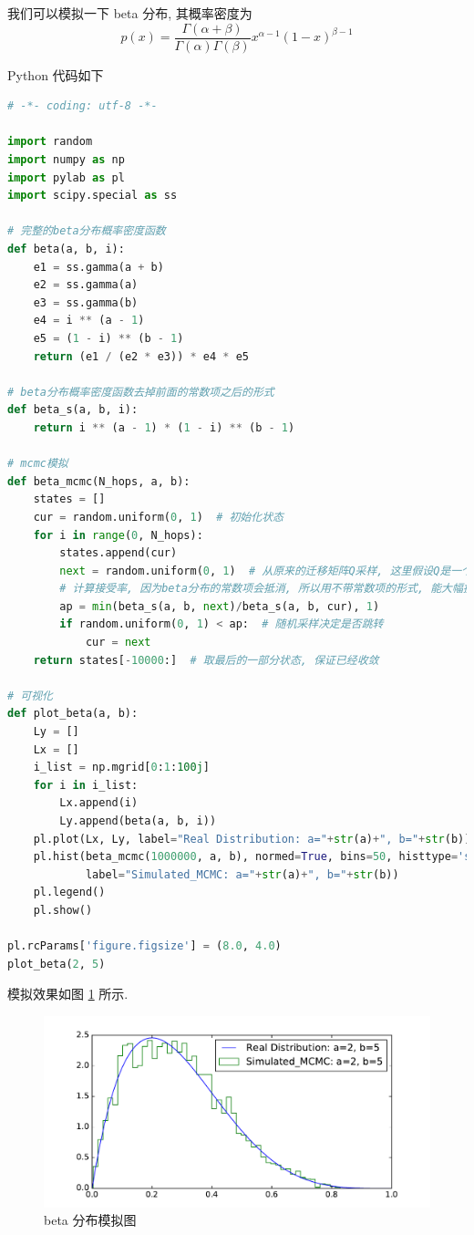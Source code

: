 \documentclass[a4paper,UTF8]{ctexart}
\theoremstyle{plain} \newtheorem{theorem}{定理}[section]
\theoremstyle{plain} \newtheorem{definition}{定义}[section]
\theoremstyle{plain} \newtheorem{lemma}{引理}[section]
\theoremstyle{plain} \newtheorem{proposition}{命题}[section]
\theoremstyle{plain} \newtheorem{example}{例}[section]
\theoremstyle{plain} \newtheorem{remark}{注}[section]
\theoremstyle{plain} \newtheorem{corollary}{推论}[section]
\begin{document}
我们可以模拟一下 beta 分布, 其概率密度为
\begin{equation*}
p(x) = \frac{\Gamma(\alpha + \beta)}{\Gamma(\alpha) \Gamma(\beta)} x^{\alpha - 1} (1 - x)^{\beta - 1}
\end{equation*}

Python 代码如下
\begin{lstlisting}[language = python]
# -*- coding: utf-8 -*-

import random
import numpy as np
import pylab as pl
import scipy.special as ss

# 完整的beta分布概率密度函数
def beta(a, b, i):
    e1 = ss.gamma(a + b)
    e2 = ss.gamma(a)
    e3 = ss.gamma(b)
    e4 = i ** (a - 1)
    e5 = (1 - i) ** (b - 1)
    return (e1 / (e2 * e3)) * e4 * e5

# beta分布概率密度函数去掉前面的常数项之后的形式
def beta_s(a, b, i):
    return i ** (a - 1) * (1 - i) ** (b - 1)

# mcmc模拟
def beta_mcmc(N_hops, a, b):
    states = []
    cur = random.uniform(0, 1)  # 初始化状态
    for i in range(0, N_hops):
        states.append(cur)
        next = random.uniform(0, 1)  # 从原来的迁移矩阵Q采样, 这里假设Q是一个基于均匀分布的迁移矩阵
        # 计算接受率, 因为beta分布的常数项会抵消, 所以用不带常数项的形式, 能大幅提速. 而且Q是均匀分布, 所以也相互抵消了
        ap = min(beta_s(a, b, next)/beta_s(a, b, cur), 1)
        if random.uniform(0, 1) < ap:  # 随机采样决定是否跳转
            cur = next
    return states[-10000:]  # 取最后的一部分状态, 保证已经收敛

# 可视化
def plot_beta(a, b):
    Ly = []
    Lx = []
    i_list = np.mgrid[0:1:100j]
    for i in i_list:
        Lx.append(i)
        Ly.append(beta(a, b, i))
    pl.plot(Lx, Ly, label="Real Distribution: a="+str(a)+", b="+str(b))
    pl.hist(beta_mcmc(1000000, a, b), normed=True, bins=50, histtype='step',
            label="Simulated_MCMC: a="+str(a)+", b="+str(b))
    pl.legend()
    pl.show()

pl.rcParams['figure.figsize'] = (8.0, 4.0)
plot_beta(2, 5)
\end{lstlisting}

模拟效果如图 \ref{beta} 所示.
\begin{figure}[!htb]
	\centering
	\includegraphics[width = 0.85 \textwidth]{beta.pdf}
	\caption{beta 分布模拟图}
	\label{beta}
\end{figure}
\end{document}
